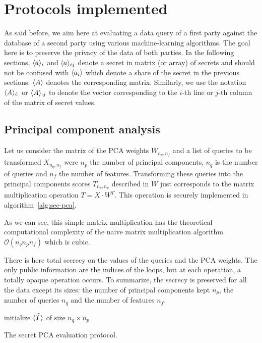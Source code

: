 \section{Protocols implemented}
As said before, we aim here at evaluating a data query of a first party against the database of a second party using various machine-learning algorithms. The goal here is to preserve the privacy of the data of both parties. In the following sections, $\langle a \rangle_i$ and $\langle a \rangle_{ij}$ denote a secret in matrix (or array) of secrets and should not be confused with $\langle a_i \rangle$ which denote a share of the secret in the previous sections. $\langle A \rangle$ denotes the corresponding matrix. Similarly, we use the notation $\langle A \rangle_{i:}$ or  $\langle A \rangle_{:j}$ to denote the vector corresponding to the $i$-th line or $j$-th column of the matrix of secret values.

\subsection{Principal component analysis}
Let us consider the matrix of the PCA weights $W_{n_p , n_f}$ and a list of queries to be transformed $X_{n_q , n_f}$ were $n_p$ the number of principal components, $n_q$ is the number of queries and $n_f$ the number of features. Transforming these queries into the principal components scores $T_{n_q , n_p}$ described in $W$ just corresponds to the matrix multiplication operation $T=X \cdot W^T$. This operation is securely implemented in algorithm~\ref{alg:sec-pca}.

As we can see, this simple matrix multiplication has the theoretical computational complexity of the naive matrix multiplication algorithm $\mathcal{O}(n_q n_p n_f)$ which is cubic.

There is here total secrecy on the values of the queries and the PCA weights. The only public information are the indices of the loops, but at each operation, a totally opaque operation occurs. To summarize, the secrecy is preserved for all the data except its sizes: the number of principal components kept $n_p$, the number of queries $n_q$ and the number of features $n_f$.

\begin{center}
\begin{algorithm}[H]
\DontPrintSemicolon
initialize $\langle \tilde{T} \rangle$ of size $n_q \times n_p$ \;
\caption{The secret PCA evaluation protocol.}
\label{alg:sec-pca}
\end{algorithm}
\end{center}

